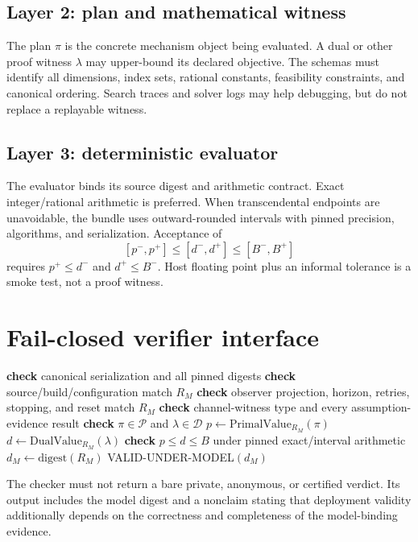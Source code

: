 \documentclass[11pt]{article}
\begin{document}
\subsection{Layer 2: plan and mathematical witness}
The plan \(\pi\) is the concrete mechanism object being evaluated. A dual or other proof witness \(\lambda\) may upper-bound its declared objective. The schemas must identify all dimensions, index sets, rational constants, feasibility constraints, and canonical ordering. Search traces and solver logs may help debugging, but do not replace a replayable witness.

\subsection{Layer 3: deterministic evaluator}
The evaluator binds its source digest and arithmetic contract. Exact integer/rational arithmetic is preferred. When transcendental endpoints are unavoidable, the bundle uses outward-rounded intervals with pinned precision, algorithms, and serialization. Acceptance of
\[
[p^-,p^+]\le[d^-,d^+]\le[B^-,B^+]
\]
requires \(p^+\le d^-\) and \(d^+\le B^-\). Host floating point plus an informal tolerance is a smoke test, not a proof witness.

\section{Fail-closed verifier interface}\label{sec:verifier}
\begin{algorithm}[h]
\caption{Model-bound budget verification}
\begin{algorithmic}[1]
  \State \textbf{check} canonical serialization and all pinned digests
  \State \textbf{check} source/build/configuration match $R_M$
  \State \textbf{check} observer projection, horizon, retries, stopping, and reset match $R_M$
  \State \textbf{check} channel-witness type and every assumption-evidence result
  \State \textbf{check} $\pi\in\mathcal P$ and $\lambda\in\mathcal D$
  \State $p\gets\mathrm{PrimalValue}_{R_M}(\pi)$
  \State $d\gets\mathrm{DualValue}_{R_M}(\lambda)$
  \State \textbf{check} $p\le d\le B$ under pinned exact/interval arithmetic
  \State $d_M\gets\mathrm{digest}(R_M)$
  \State \Return \textsf{VALID-UNDER-MODEL}$(d_M)$
\EndProcedure
\end{algorithmic}
\end{algorithm}

The checker must not return a bare \textsf{private}, \textsf{anonymous}, or \textsf{certified} verdict. Its output includes the model digest and a nonclaim stating that deployment validity additionally depends on the correctness and completeness of the model-binding evidence.
\end{document}
